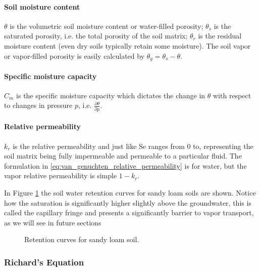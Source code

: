 \paragraph{Soil moisture content}

$\theta$ is the volumetric soil moisture content or water-filled porosity; $\theta_s$ is the saturated porosity, i.e. the total porosity of the soil matrix; $\theta_r$ is the residual moisture content (even dry soils typically retain some moisture).
The soil vapor or vapor-filled porosity is easily calculated by $\theta_g = \theta_s - \theta$.

\paragraph{Specific moisture capacity}

$C_m$ is the specific moisture capacity which dictates the change in $\theta$ with respect to changes in pressure $p$, i.e. $\frac{\partial \theta}{\partial p}$.

\paragraph{Relative permeability}

$k_r$ is the relative permeability and just like $\mathrm{Se}$ ranges from 0 to, representing the soil matrix being fully impermeable and permeable to a particular fluid.
The formulation in \eqref{eq:van_genuchten_relative_permeability} is for water, but the vapor relative permeability is simple $1 - k_r$.\par

In Figure \ref{fig:van_genuchten} the soil water retention curves for sandy loam soils are shown.
Notice how the saturation is significantly higher slightly above the groundwater, this is called the capillary fringe and presents a significantly barrier to vapor transport, as we will see in future sections\par

\begin{figure}[htb!]
  \caption{Retention curves for sandy loam soil.}
  \label{fig:van_genuchten}
\end{figure}

\subsubsection{Richard's Equation}

